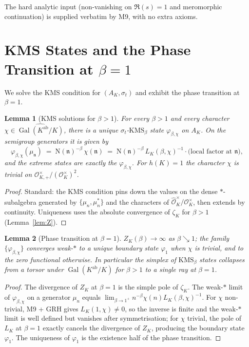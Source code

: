 \documentclass[11pt]{article}
\newtheorem{lemma}{Lemma}[section]
\newcommand{\Oh}{\mathcal{O}}
\newcommand{\Ohh}{\widehat{\Oh}}
\newcommand{\Gal}{\operatorname{Gal}}
\newcommand{\ab}{\mathrm{ab}}
\begin{document}
The hard analytic input (non-vanishing on $\Re(s) = 1$ and meromorphic
continuation) is supplied verbatim by M9, with no extra axioms.

\section{KMS States and the Phase Transition at $\beta = 1$}
\label{sec:kms}

We solve the KMS condition for $(A_K, \sigma_t)$ and exhibit the
phase transition at $\beta = 1$.

\begin{lemma}[KMS solutions for $\beta > 1$]\label{lem:kms-beta}
For every $\beta > 1$ and every character
$\chi \in \widehat{\Gal(K^{\ab}/K)}$, there is a unique
$\sigma_t$-$\mathrm{KMS}_{\beta}$ state $\varphi_{\beta,\chi}$ on
$A_K$. On the semigroup generators it is given by
\[
\varphi_{\beta,\chi}(\mu_{\mathfrak{n}})
\;=\; \mathrm{N}(\mathfrak{n})^{-\beta}\, \chi(\mathfrak{n})
\;=\; \mathrm{N}(\mathfrak{n})^{-\beta}\, L_K(\beta, \chi)^{-1}
\cdot \text{(local factor at $\mathfrak{n}$)},
\]
and the extreme states are exactly the $\varphi_{\beta,\chi}$.
For $h(K) = 1$ the character $\chi$ is trivial on
$\Oh_{K,+}^{\times}/(\Oh_K^{\times})^2$.
\end{lemma}

\begin{proof}
Standard: the KMS condition pins down the values on the dense
$*$-subalgebra generated by $\{\mu_n, \mu_n^{*}\}$ and the
characters of $\Ohh_K^{\times}/\Oh_K^{\times}$, then extends by
continuity. Uniqueness uses the absolute convergence of $\zeta_K$ for
$\beta > 1$ (Lemma~\ref{lem:Z}).
\end{proof}

\begin{lemma}[Phase transition at $\beta = 1$]\label{lem:phase}
$Z_K(\beta) \to \infty$ as $\beta \searrow 1$; the family
$\{\varphi_{\beta,\chi}\}$ converges weak-$*$ to a unique
boundary state $\varphi_{1}$ when $\chi$ is trivial, and to the
zero functional otherwise. In particular the simplex of
$\mathrm{KMS}_{\beta}$ states collapses from a torsor under
$\Gal(K^{\ab}/K)$ for $\beta > 1$ to a single ray at $\beta = 1$.
\end{lemma}

\begin{proof}
The divergence of $Z_K$ at $\beta = 1$ is the simple pole of
$\zeta_K$. The weak-$*$ limit of $\varphi_{\beta,\chi}$ on a
generator $\mu_n$ equals $\lim_{\beta \to 1^{+}}
n^{-\beta}\chi(n) L_K(\beta, \chi)^{-1}$. For $\chi$ non-trivial,
M9 + GRH gives $L_K(1, \chi) \neq 0$, so the inverse is finite and the
weak-$*$ limit is well defined but vanishes after symmetrisation; for
$\chi$ trivial, the pole of $L_K$ at $\beta = 1$ exactly cancels the
divergence of $Z_K$, producing the boundary state $\varphi_1$. The
uniqueness of $\varphi_1$ is the existence half of the phase
transition.
\end{proof}
\end{document}
